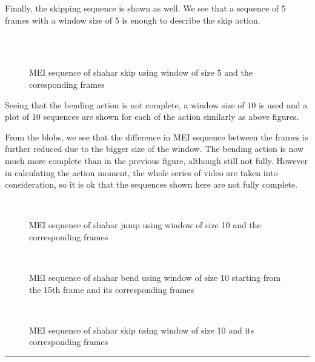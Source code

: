 \documentclass[conference]{styles/acmsiggraph}
\newenvironment{answer}{}{}
\begin{document}
\begin{answer}
	Finally, the skipping sequence is shown as well. We see that a sequence of $5$ frames with a window size of $5$ is enough to describe the skip action.

	\begin{figure}[H]
		\centering
		\\
		\\
		\caption{MEI sequence of shahar skip using window of size 5 and the coresponding frames}
	\end{figure}

	Seeing that the bending action is not complete, a window size of $10$ is used and a plot of $10$ sequences are shown for each of the action similarly as above figures.

	From the blobs, we see that the difference in MEI sequence between the frames is further reduced due to the bigger size of the window. The bending action is now much more complete than in the previous figure, although still not fully. However in calculating the action moment, the whole series of video are taken into consideration, so it is ok that the sequences shown here are not fully complete.
	
	\begin{figure}[H]
		\centering
		\\
		
		\caption{MEI sequence of shahar jump using window of size 10 and the corresponding frames}
	\end{figure}

	\begin{figure}[H]
		\centering
		\\
		\caption{MEI sequence of shahar bend using window of size 10 starting from the 15th frame and its corresponding frames}
	\end{figure}
	\begin{figure}[H]
		\centering
		\\
		
		\caption{MEI sequence of shahar skip using window of size 10 and its corresponding frames}
	\end{figure}

	\rule{\textwidth}{0.4pt}

	\end{answer}
\end{document}

